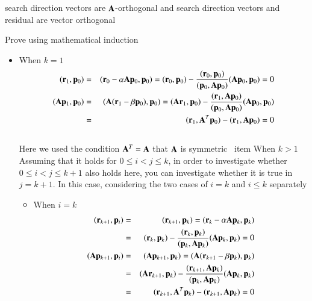 search direction vectors are $\mathbf{A}$-orthogonal and search direction vectors and residual are vector orthogonal


%
Prove using mathematical induction

\begin{itemize}

\item When $k=1$ \\
\begin{eqnarray}
(\mathbf{r}_1,\mathbf{p}_0)
&=&  (\mathbf{r}_0-\alpha\mathbf{A}\mathbf{p}_0,\mathbf{p}_0) = (\mathbf{r}_0,\mathbf{p}_0)-\frac{(\mathbf{r}_0,\mathbf{p}_0)}{(\mathbf{p}_0,\mathbf{A}\mathbf{p}_0)}(\mathbf{A}\mathbf{p}_0,\mathbf{p}_0)  =  0 \\
(\mathbf{A}\mathbf{p}_1,\mathbf{p}_0)
&=& (\mathbf{A}(\mathbf{r}_1-\beta\mathbf{p}_0),\mathbf{p}_0) = (\mathbf{A}\mathbf{r}_1,\mathbf{p}_0)-\frac{(\mathbf{r}_1,\mathbf{A}\mathbf{p}_0)}{(\mathbf{p}_0,\mathbf{A}\mathbf{p}_0)}(\mathbf{A}\mathbf{p}_0,\mathbf{p}_0) \\
&=& (\mathbf{r}_1,\mathbf{A}^T\mathbf{p}_0)-(\mathbf{r}_1,\mathbf{A}\mathbf{p}_0)=0
\end{eqnarray}\\
Here we used the condition $\mathbf{A}^T=\mathbf{A}$ that $\mathbf{A}$ is symmetric
\ item When $k>1$ \\
Assuming that it holds for $0\le{i}<{j}\le{k}$, in order to investigate whether $0\le{i}<{j}\le{k+1}$ also holds here, you can investigate whether it is true in $j=k+1$. In this case, considering the two cases of $i=k$ and $i\le{k}$ separately
\begin {itemize}
\item When $i=k$ \ \
\begin{eqnarray}
(\mathbf{r}_{k+1},\mathbf{p}_i)
&=&  (\mathbf{r}_{k+1},\mathbf{p}_k)  =  (\mathbf{r}_k-\alpha\mathbf{A}\mathbf{p}_k,\mathbf{p}_k) \\
&=& (\mathbf{r}_k,\mathbf{p}_k)-\frac{(\mathbf{r}_k,\mathbf{p}_k)}{(\mathbf{p}_k,\mathbf{A}\mathbf{p}_k)}(\mathbf{A}\mathbf{p}_k,\mathbf{p}_k)=0\\
(\mathbf{A}\mathbf{p}_{k+1},\mathbf{p}_i)
&=& (\mathbf{A}\mathbf{p}_{k+1},\mathbf{p}_k) = (\mathbf{A}(\mathbf{r}_{k+1}-\beta\mathbf{p}_k),\mathbf{p}_k) \\
&=& (\mathbf{A}\mathbf{r}_{k+1},\mathbf{p}_k)-\frac{(\mathbf{r}_{k+1},\mathbf{A}\mathbf{p}_k)}{(\mathbf{p}_k,\mathbf{A}\mathbf{p}_k)}(\mathbf{A}\mathbf{p}_k,\mathbf{p}_k) \\
&=& (\mathbf{r}_{k+1},\mathbf{A}^T\mathbf{p}_k)-(\mathbf{r}_{k+1},\mathbf{A}\mathbf{p}_k)=0
\end{eqnarray}


\end{itemize}
\end{itemize}
